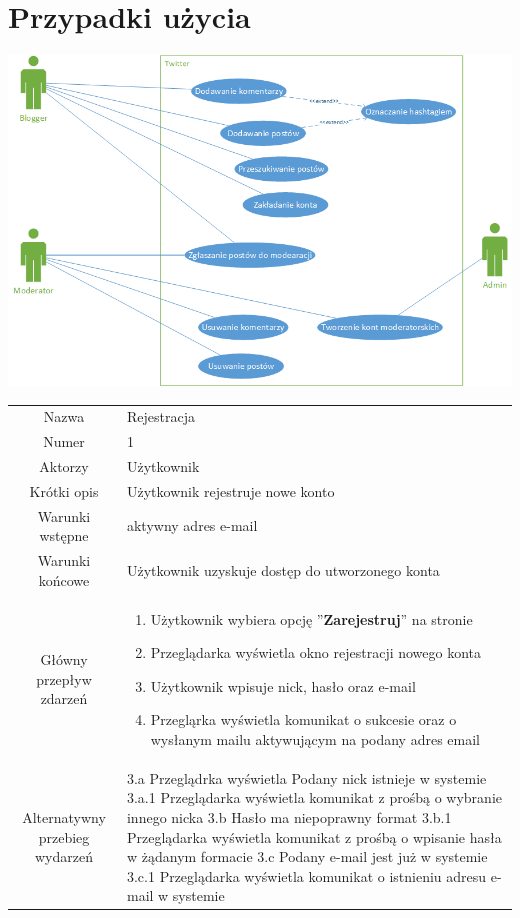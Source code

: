 \documentclass[a4paper]{article}
\begin{document}
\section{Przypadki użycia}
\includegraphics[width=\textwidth]{usecase}
\begin{tabular}{c p{10cm}}
Nazwa& Rejestracja	\\
Numer	& 1\\
Aktorzy & Użytkownik \\
Krótki opis & Użytkownik rejestruje nowe konto \\
Warunki wstępne&  aktywny adres e-mail\\
Warunki końcowe& Użytkownik uzyskuje dostęp do utworzonego konta\\
Główny przepływ zdarzeń&
\begin{enumerate} 
\item Użytkownik wybiera opcję ''\textbf{Zarejestruj}'' na stronie 
\item Przeglądarka wyświetla okno rejestracji nowego konta 
\item Użytkownik wpisuje nick, hasło oraz e-mail 
\item Przegląrka wyświetla komunikat o sukcesie oraz o wysłanym mailu aktywującym na podany adres email
\end{enumerate} \\
Alternatywny przebieg wydarzeń & 
3.a Przeglądrka wyświetla Podany nick istnieje w systemie \newline
3.a.1 Przeglądarka wyświetla komunikat z prośbą o wybranie innego nicka\newline
3.b Hasło ma niepoprawny format \newline
3.b.1 Przeglądarka wyświetla komunikat z prośbą o wpisanie hasła w żądanym formacie\newline
3.c Podany e-mail jest już w systemie \newline
3.c.1 Przeglądarka wyświetla komunikat o istnieniu adresu e-mail w systemie \newline
\\
\hline
\end{tabular}
\newline
\newline\\
\\
\end{document}
